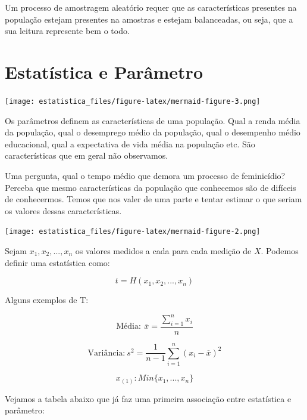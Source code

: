 \documentclass[
  letterpaper,
  DIV=11,
  numbers=noendperiod]{scrreprt}
\begin{document}
Um processo de amostragem aleatório requer que as características
presentes na população estejam presentes na amostras e estejam
balanceadas, ou seja, que a sua leitura represente bem o todo.

\section{Estatística e Parâmetro}\label{estatuxedstica-e-paruxe2metro}

\texttt{[image: estatistica\_files/figure-latex/mermaid-figure-3.png]}

Os parâmetros definem as características de uma população. Qual a renda
média da população, qual o desemprego médio da população, qual o
desempenho médio educacional, qual a expectativa de vida média na
população etc. São características que em geral não observamos.

Uma pergunta, qual o tempo médio que demora um processo de feminicídio?
Perceba que mesmo características da população que conhecemos são de
difíceis de conhecermos. Temos que nos valer de uma parte e tentar
estimar o que seriam os valores dessas características.

\texttt{[image: estatistica\_files/figure-latex/mermaid-figure-2.png]}

Sejam \(x_1, x_2,..., x_{n}\) os valores medidos a cada para cada
medição de \(X\). Podemos definir uma estatística como:

\[ t= H (x_1, x_2, ..., x_{n})\]

Alguns exemplos de T:

\[ \text{Média}: \ \overline{x}=\frac{\sum_{i=1}^{n} x_i}{n}\]

\[ \text{Variância:} \ s^{2}= \frac{1}{n-1} \sum_{i=1}^{n} (x_i - \overline{x})^{2} \]

\[ x_{(1)}: Min\{x_1, ..., x_n\}\]

Vejamos a tabela abaixo que já faz uma primeira associação entre
estatística e parâmetro:
\end{document}
